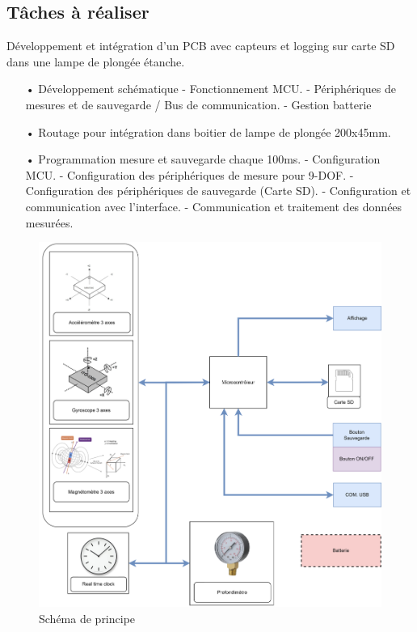 \clearpage





\subsection{Tâches à réaliser}
Développement et intégration d’un PCB avec capteurs et logging sur carte SD dans une lampe de plongée étanche.
    \begin{itemize}
        \item[•] Développement schématique 
        \subitem- Fonctionnement MCU.
        \subitem-	Périphériques de mesures et de sauvegarde / Bus de communication.
        \subitem-	Gestion batterie 
        \item[•]	Routage pour intégration dans boitier de lampe de plongée 200x45mm.
        \item[•]	Programmation mesure et sauvegarde chaque 100ms.
        \subitem-	Configuration MCU.
        \subitem-	Configuration des périphériques de mesure pour 9-DOF.
        \subitem-	Configuration des périphériques de sauvegarde (Carte SD).
        \subitem-	Configuration et communication avec l'interface.
        \subitem-	Communication et traitement des données mesurées.
\end{itemize}


\begin{figure}[hb]
    \includegraphics[width=.65\textwidth, center,]{../CDC/Figures/pre-etude.drawio.png}
    \caption{Schéma de principe}
\end{figure}
\clearpage


